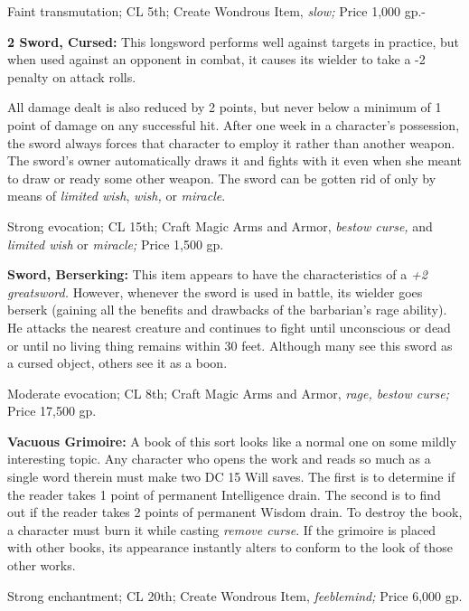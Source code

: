Faint transmutation; CL 5th; Create Wondrous Item, \textit{slow; }Price 1,000 gp.-

\textbf{2 Sword, Cursed:} This longsword performs well against targets in practice, 
but when used against an opponent in combat, it causes its wielder to take a -2 
penalty on attack rolls.

All damage dealt is also reduced by 2 points, but never below a minimum of 1 point 
of damage on any successful hit. After one week in a character's possession, the 
sword always forces that character to employ it rather than another weapon. The 
sword's owner automatically draws it and fights with it even when she meant to 
draw or ready some other weapon. The sword can be gotten rid of only by means of 
\textit{limited wish}, \textit{wish, }or \textit{miracle}.

Strong evocation; CL 15th; Craft Magic Arms and Armor, \textit{bestow curse, }and 
\textit{limited wish }or \textit{miracle; }Price 1,500 gp.

\textbf{Sword, Berserking: }This item appears to have the characteristics of a 
\textit{+2 greatsword. }However, whenever the sword is used in battle, its wielder 
goes berserk (gaining all the benefits and drawbacks of the barbarian's rage ability). 
He attacks the nearest creature and continues to fight until unconscious or dead 
or until no living thing remains within 30 feet. Although many see this sword as 
a cursed object, others see it as a boon.

Moderate evocation; CL 8th; Craft Magic Arms and Armor, \textit{rage, bestow curse; 
}Price 17,500 gp.

\textbf{Vacuous Grimoire: }A book of this sort looks like a normal one on some 
mildly interesting topic. Any character who opens the work and reads so much as 
a single word therein must make two DC 15 Will saves. The first is to determine 
if the reader takes 1 point of permanent Intelligence drain. The second is to find 
out if the reader takes 2 points of permanent Wisdom drain. To destroy the book, 
a character must burn it while casting \textit{remove curse}. If the grimoire is 
placed with other books, its appearance instantly alters to conform to the look 
of those other works.

Strong enchantment; CL 20th; Create Wondrous Item, \textit{feeblemind; }Price 6,000 
gp.
